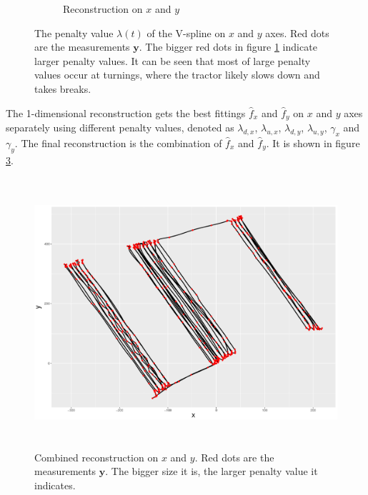 \begin{figure}
\begin{subfigure}{\textwidth}
    \caption{Reconstruction on $x$ and $y$}\label{penaltyxyggXYPath}
    \end{subfigure}
 \caption{The penalty value $\lambda(t)$ of the V-spline on $x$ and $y$ axes. Red dots are the measurements $\mathbf{y}$. The bigger red dots in figure \ref{penaltyxyggXYPath} indicate larger penalty values. It can be seen that most of large penalty values occur at turnings, where the tractor likely slows down and takes breaks. }\label{penaltyxygg}
 \end{figure}

The 1-dimensional reconstruction gets the best fittings $\hat{f}_x$ and $\hat{f}_y$ on $x$ and $y$ axes separately using different penalty values, denoted as $\lambda_{d,x}$, $\lambda_{u,x}$, $\lambda_{d,y}$, $\lambda_{u,y}$, $\gamma_x$ and $\gamma_y$. The final reconstruction is the combination of  $\hat{f}_x$ and $\hat{f}_y$. It is shown in figure \ref{1DCombinedXY}. 
\begin{figure}
  \centering
    \includegraphics[width=\textwidth,height=10cm]{Chapters/02TractorSplineTheory/plot/ggplot/ggRealdataCombinedXY2.pdf} 
  \caption{Combined reconstruction on $x$ and $y$. Red dots are the measurements $\mathbf{y}$. The bigger size it is, the larger penalty value it indicates. }\label{1DCombinedXY}
\end{figure}



